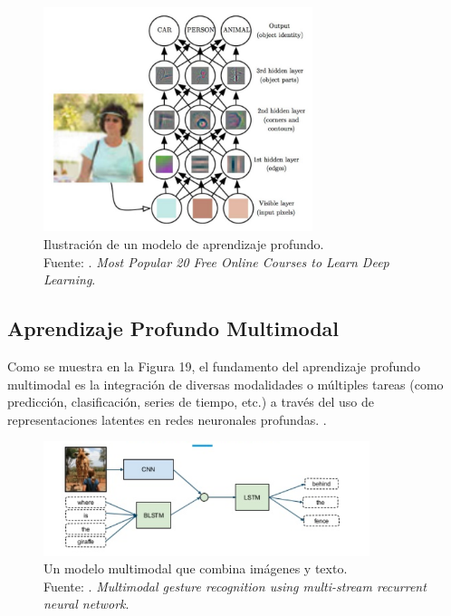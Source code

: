 \begin{figure}[!ht]
	\begin{center}
		\includegraphics[width=0.70\textwidth]{2/figures/deeplearning_machinelearning2.jpg}
		\caption[Ilustración de un modelo de aprendizaje profundo]{Ilustración de un modelo de aprendizaje profundo.\\
		Fuente: \cite{tec_cook2018deeplearning}. \textit{Most Popular 20 Free Online Courses to Learn Deep Learning}.}
		\label{2:fig6}
	\end{center}
\end{figure}


\subsection{Aprendizaje Profundo Multimodal}
Como se muestra en la Figura 19, el fundamento del aprendizaje profundo multimodal es la integración de diversas modalidades o múltiples tareas (como predicción, clasificación, series de tiempo, etc.) a través del uso de representaciones latentes en redes neuronales profundas. \parencite{bk_deng2018deeplearningnlp}.

\begin{figure}[!ht]
	\begin{center}
		\includegraphics[width=0.85\textwidth]{2/figures/multimodal_network.png}
		\caption[Un modelo multimodal que combina imágenes y texto]{Un modelo multimodal que combina imágenes y texto.\\
		Fuente: \cite{tec_nishida2015multimodal}. \textit{Multimodal gesture recognition using multi-stream recurrent neural network}.}
		\label{2:fig7}
	\end{center}
\end{figure}

